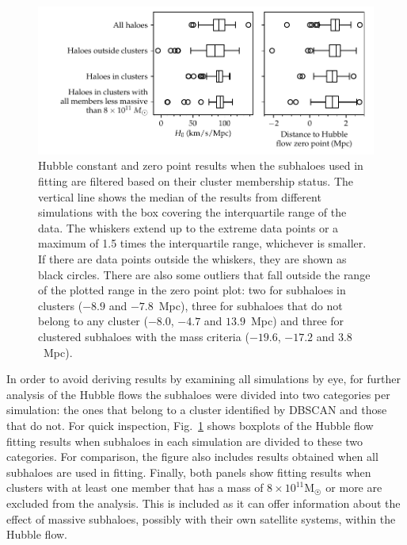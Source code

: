 \documentclass[english, twoside]{HYgradu}
\begin{document}
\begin{figure}
    \centering
    \includegraphics{kuvat/clusteredHFparameters.pdf}
    \caption{Hubble constant and zero point results when the subhaloes used in fitting are filtered based on their cluster membership status. The vertical line shows the median of the results from different simulations with the box covering the interquartile range of the data. The whiskers extend up to the extreme data points or a maximum of 1.5 times the interquartile range, whichever is smaller. If there are data points outside the whiskers, they are shown as black circles. There are also some outliers that fall outside the range of the plotted range in the zero point plot: two for subhaloes in clusters ($-8.9$ and $-7.8$~Mpc), three for subhaloes that do not belong to any cluster ($-8.0$, $-4.7$ and $13.9$~Mpc) and three for clustered subhaloes with the mass criteria ($-19.6$, $-17.2$ and $3.8$~Mpc).}\label{fig:clusteredHFparameters}
\end{figure}

In order to avoid deriving results by examining all simulations by eye, for further analysis of the Hubble flows the subhaloes were divided into two categories per simulation: the ones that belong to a cluster identified by DBSCAN and those that do not. For quick inspection, Fig.~\ref{fig:clusteredHFparameters} shows boxplots of the Hubble flow fitting results when subhaloes in each simulation are divided to these two categories. For comparison, the figure also includes results obtained when all subhaloes are used in fitting. Finally, both panels show fitting results when clusters with at least one member that has a mass of $8 \times 10^{11} \mathrm{M}_{\astrosun}$ or more are excluded from the analysis. This is included as it can offer information about the effect of massive subhaloes, possibly with their own satellite systems, within the Hubble flow.
\end{document}
